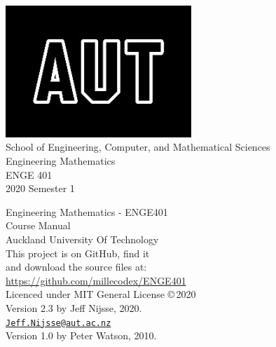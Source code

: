 \documentclass[a4paper,11pt,openany,oneside]{book}
\begin{document}
\frontmatter
\begin{titlepage}
\begin{center}

\includegraphics[width=7cm]{AUTlogo}\\
{\vspace{2cm}}
 {\Large School of Engineering, Computer, and Mathematical Sciences}
 \vspace{3cm}\\
 {\huge Engineering Mathematics}\\
 \vspace{1cm}
{\huge ENGE 401} \\
 \vspace{1cm}
{\huge 2020 Semester 1} \\
 \vfill
\end{center}
\end{titlepage}

\clearpage\thispagestyle{empty}
\vspace*{\fill}
Engineering Mathematics - ENGE401\\
Course Manual\\
Auckland University Of Technology\\

This project is on GitHub, find it \\
and download the source files at: \\
\url{https://github.com/millecodex/ENGE401} \\                            

Licenced under MIT General License \copyright \,2020 \\   

Version 2.3 by Jeff Nijsse, 2020.\\
\href{mailto:Jeff.Nijsse@aut.ac.nz}{\texttt{Jeff.Nijsse@aut.ac.nz}}\\
Version 1.0 by Peter Watson, 2010.

\clearpage
{}

%
\tableofcontents
\mainmatter








%
\end{document}
